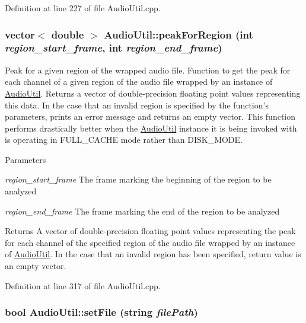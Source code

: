 Definition at line 227 of file AudioUtil.cpp.\hypertarget{classAudioUtil_ac32f8bd852e56ada63ea24fa666c08db}{
\subsubsection[{peakForRegion}]{\setlength{\rightskip}{0pt plus 5cm}vector$<$ double $>$ AudioUtil::peakForRegion (int {\em region\_\-start\_\-frame}, \/  int {\em region\_\-end\_\-frame})}}
\label{classAudioUtil_ac32f8bd852e56ada63ea24fa666c08db}


Peak for a given region of the wrapped audio file. Function to get the peak for each channel of a given region of the audio file wrapped by an instance of \hyperlink{classAudioUtil}{AudioUtil}. Returns a vector of double-\/precision floating point values representing this data. In the case that an invalid region is specified by the function's parameters, prints an error message and returns an empty vector. This function performs drastically better when the \hyperlink{classAudioUtil}{AudioUtil} instance it is being invoked with is operating in FULL\_\-CACHE mode rather than DISK\_\-MODE.


\begin{DoxyParams}{Parameters}
\item[{\em region\_\-start\_\-frame}]The frame marking the beginning of the region to be analyzed \item[{\em region\_\-end\_\-frame}]The frame marking the end of the region to be analyzed \end{DoxyParams}
\begin{DoxyReturn}{Returns}
A vector of double-\/precision floating point values representing the peak for each channel of the specified region of the audio file wrapped by an instance of \hyperlink{classAudioUtil}{AudioUtil}. In the case that an invalid region has been specified, return value is an empty vector. 
\end{DoxyReturn}


Definition at line 317 of file AudioUtil.cpp.\hypertarget{classAudioUtil_a5f477f4385a0da16f930d627dc168723}{
\subsubsection[{setFile}]{\setlength{\rightskip}{0pt plus 5cm}bool AudioUtil::setFile (string {\em filePath})}}
\label{classAudioUtil_a5f477f4385a0da16f930d627dc168723}


